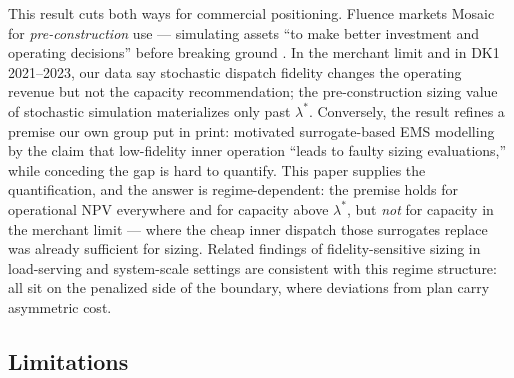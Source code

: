 \documentclass[11pt]{article}
\begin{document}
This result cuts both ways for commercial positioning. Fluence markets Mosaic for \emph{pre-construction} use --- simulating assets ``to make better investment and operating decisions'' before breaking ground \citep{fluence2024mosaic}. In the merchant limit and in DK1 2021--2023, our data say stochastic dispatch fidelity changes the operating revenue but not the capacity recommendation; the pre-construction sizing value of stochastic simulation materializes only past $\lambda^*$. Conversely, the result refines a premise our own group put in print: \citet{assaad2025surrogate} motivated surrogate-based EMS modelling by the claim that low-fidelity inner operation ``leads to faulty sizing evaluations,'' while conceding the gap is hard to quantify. This paper supplies the quantification, and the answer is regime-dependent: the premise holds for operational NPV everywhere and for capacity above $\lambda^*$, but \emph{not} for capacity in the merchant limit --- where the cheap inner dispatch those surrogates replace was already sufficient for sizing. Related findings of fidelity-sensitive sizing in load-serving and system-scale settings \citep{dinh2025financial, cauz2023rl, schmidt2025foresight} are consistent with this regime structure: all sit on the penalized side of the boundary, where deviations from plan carry asymmetric cost.

\subsection{Limitations}
\end{document}
